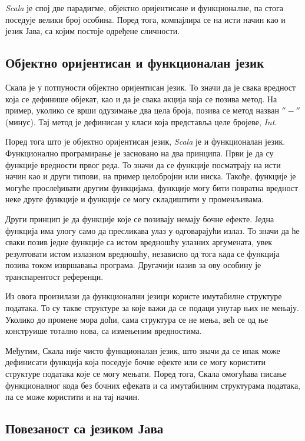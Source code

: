 \documentclass[12pt,oneside]{memoir}
\begin{document}
\textit{Scala} је спој две парадигме, објектно оријентисане и функционалне, па стога поседује велики број особина. Поред тога, компајлира се на исти начин као и језик Јава, са којим постоје одређене сличности.

\subsection{Објектно оријентисан и функционалан језик}
\label{subsec:scala_obj_prog}

Скала је у потпуности објектно оријентисан језик. То значи да је свака вредност која се дефинише објекат, као и да је свака акција која се позива метод. На пример, уколико се врши одузимање два цела броја, позива се метод назван $''-''$ (минус). Тај метод је дефинисан у класи која представља целе бројеве, \textit{Int}. \cite{scala_prog}

Поред тога што је објектно оријентисан језик, \textit{Scala} је и функционалан језик. Функционално програмирање је засновано на два принципа. Први је да су функције вредности првог реда. То значи да се функције посматрају на исти начин као и други типови, на пример целобројни или ниска. Такође, функције је могуће прослеђивати другим функцијама, функције могу бити повратна вредност неке друге функције и функције се могу складиштити у променљивама.

Други принцип је да функције које се позивају немају бочне ефекте. Једна функција има улогу само да пресликава улаз у одговарајући излаз. То значи да ће сваки позив једне функције са истом вредношћу улазних аргумената, увек резултовати истом излазном вредношћу, независно од тога када се функција позива током извршавања програма. Другачији назив за ову особину је транспарентост референци. \cite{scala_prog}

Из овога произилази да функционални језици користе имутабилне структуре података. То су такве структуре за које важи да се подаци унутар њих не мењају. Уколико до промене мора доћи, сама структура се не мења, већ се од ње конструише тотално нова, са измењеним вредностима. \cite{scala_prog}

Међутим, Скала није чисто функционалан језик, што значи да се ипак може дефинисати функција која поседује бочне ефекте или се могу користити структуре података које се могу мењати. Поред тога, Скала омогућава писање функционалног кода без бочних ефеката и са имутабилним структурама података, па се може користити и на тај начин. \cite{scala_prog}

\subsection{Повезаност са језиком Јава}
\label{subsec:scala_komp}
\end{document}
